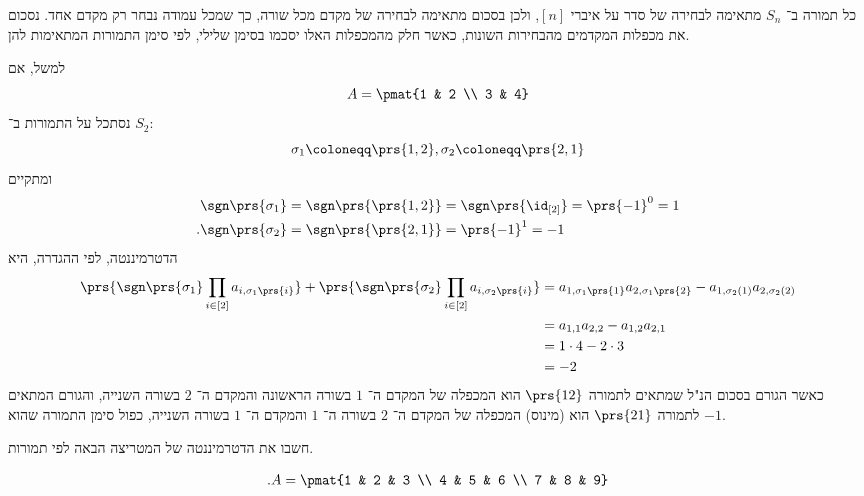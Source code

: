 \documentclass[a4paper,10pt,twoside,openany]{book}
\begin{document}
\begin{remark}
כל תמורה ב־%
$S_n$
מתאימה לבחירה של סדר על איברי
$[n]$,
ולכן בסכום מתאימה לבחירה של מקדם מכל שורה, כך שמכל עמודה נבחר רק מקדם אחד.
נסכום את מכפלות המקדמים מהבחירות השונות, כאשר חלק מהמכפלות האלו יסכמו בסימן שלילי, לפי סימן התמורות המתאימות להן.

למשל, אם
\[A = \pmat{1 & 2 \\ 3 & 4}\]
נסתכל על התמורות ב־%
$S_2$:
\[\sigma_1 \coloneqq \prs{1, 2}, \sigma_2 \coloneqq \prs{2, 1}\]
ומתקיים
\begin{align*}
\sgn\prs{\sigma_1} &= \sgn\prs{\prs{1, 2}} = \sgn\prs{\id_{[2]}} = \prs{-1}^0 = 1 \\
\text{.} \sgn\prs{\sigma_2} &= \sgn\prs{\prs{2, 1}} = \prs{-1}^1 = -1
\end{align*}
הדטרמיננטה, לפי ההגדרה, היא
\begin{align*}
\prs{\sgn\prs{\sigma_1} \prod_{i \in [2]} a_{i, \sigma_1\prs{i}}} + \prs{\sgn\prs{\sigma_2} \prod_{i \in [2]} a_{i, \sigma_2\prs{i}} }
&=
a_{1, \sigma_1\prs{1}} a_{2, \sigma_1\prs{2}} - a_{1, \sigma_2(1)} a_{2, \sigma_2(2)}
\\&=
a_{1,1} a_{2,2} - a_{1,2} a_{2,1}
\\&= 1 \cdot 4 - 2 \cdot 3
\\&= -2
\end{align*}
כאשר הגורם בסכום הנ"ל שמתאים לתמורה
$\prs{1 2}$
הוא המכפלה של המקדם ה־%
$1$
בשורה הראשונה והמקדם ה־%
$2$
בשורה השנייה, והגורם המתאים לתמורה
$\prs{2 1}$
הוא (מינוס) המכפלה של המקדם ה־%
$2$
בשורה ה־%
$1$
והמקדם ה־%
$1$
בשורה השנייה, כפול סימן התמורה שהוא
$-1$.

\end{remark}

\begin{exercisechap}
חשבו את הדטרמיננטה של המטריצה הבאה לפי תמורות.

\begin{align*}
\text{.} A = \pmat{1 & 2 & 3 \\ 4 & 5 & 6 \\ 7 & 8 & 9}
\end{align*}
\end{exercisechap}
\end{document}
